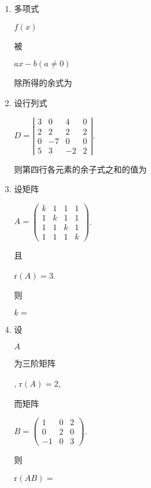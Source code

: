 \documentclass[10pt]{article}
\begin{document}
\begin{enumerate}
  \item \begin{CJK}{UTF8}{mj}多项式\end{CJK} $f(x)$ \begin{CJK}{UTF8}{mj}被\end{CJK} $a x-b(a \neq 0)$ \begin{CJK}{UTF8}{mj}除所得的余式为\end{CJK}

  \item \begin{CJK}{UTF8}{mj}设行列式\end{CJK} $D=\left|\begin{array}{cccc}3 & 0 & 4 & 0 \\ 2 & 2 & 2 & 2 \\ 0 & -7 & 0 & 0 \\ 5 & 3 & -2 & 2\end{array}\right|$. \begin{CJK}{UTF8}{mj}则第四行各元素的余子式之和的值为\end{CJK}

  \item \begin{CJK}{UTF8}{mj}设矩阵\end{CJK} $A=\left(\begin{array}{cccc}k & 1 & 1 & 1 \\ 1 & k & 1 & 1 \\ 1 & 1 & k & 1 \\ 1 & 1 & 1 & k\end{array}\right)$. \begin{CJK}{UTF8}{mj}且\end{CJK} $\mathrm{r}(A)=3$. \begin{CJK}{UTF8}{mj}则\end{CJK} $k=$

  \item \begin{CJK}{UTF8}{mj}设\end{CJK} $A$ \begin{CJK}{UTF8}{mj}为三阶矩阵\end{CJK}, $\mathrm{r}(A)=2$, \begin{CJK}{UTF8}{mj}而矩阵\end{CJK} $B=\left(\begin{array}{ccc}1 & 0 & 2 \\ 0 & 2 & 0 \\ -1 & 0 & 3\end{array}\right)$. \begin{CJK}{UTF8}{mj}则\end{CJK} $\mathrm{r}(A B)=$


\end{enumerate}
\end{document}
